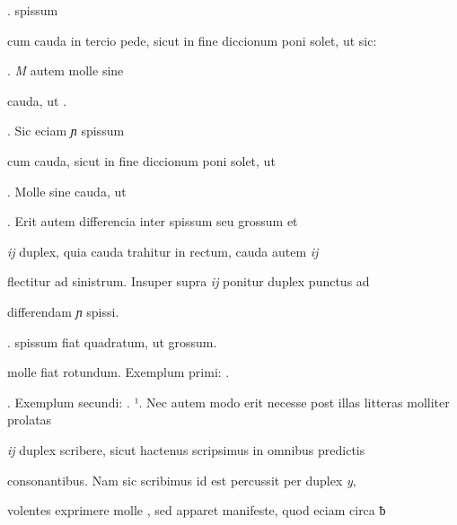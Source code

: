 .  spissum

\fulllines
cum cauda in tercio pede, sicut in fine diccionum poni solet, ut sic:

     . \textit{M} autem molle sine

\splitlines
cauda, ut    .

. Sic eciam \textit{ɲ} spissum

\fulllines

cum cauda, sicut in fine diccionum poni solet, ut  

   . Molle sine cauda, ut 

 . Erit autem differencia inter  spissum seu grossum et

\textit{ij} duplex, quia cauda  trahitur in rectum, cauda autem \textit{ij}

flectitur ad sinistrum. Insuper supra \textit{ij} ponitur duplex punctus ad

\splitlines
differendam \textit{ɲ} spissi.

.  spissum fiat quadratum, ut  grossum.

\fulllines

 molle fiat rotundum. Exemplum primi:  .  


. Exemplum secundi:    .   ¹.
Nec autem modo erit necesse post illas litteras molliter prolatas

\textit{ij} duplex scribere, sicut hactenus scripsimus in omnibus predictis

consonantibus. Nam sic scribimus  id est percussit per duplex \textit{y},

volentes exprimere molle , sed apparet manifeste, quod eciam circa ƀ

